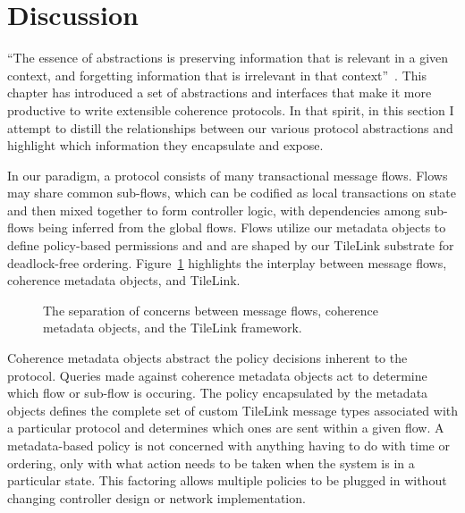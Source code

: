 
\section{Discussion}

``The essence of abstractions is preserving information that is relevant in a given context, and forgetting information that is irrelevant in that context''~\cite{guttag2014introduction}.
This chapter has introduced a set of abstractions and interfaces that make it more productive to write extensible coherence protocols.
In that spirit, in this section I attempt to distill the relationships between our various protocol abstractions and highlight which information they encapsulate and expose.


In our paradigm, a protocol consists of many transactional message flows.
Flows may share common sub-flows, which can be codified as local transactions on state
and then mixed together to form controller logic,
with dependencies among sub-flows being inferred from the global flows.
Flows utilize our metadata objects to define policy-based permissions
and and are shaped by our TileLink substrate for deadlock-free ordering.
Figure~\ref{fig:overview} highlights the interplay between message flows, coherence metadata objects, and TileLink.

\begin{figure}[t!]
\centering
\caption[Separation of Concerns.]{
The separation of concerns between message flows, coherence metadata objects, and the TileLink framework.
}
\label{fig:overview}
\end{figure}

Coherence metadata objects abstract the policy decisions inherent to the protocol.
Queries made against coherence metadata objects act to determine which flow or sub-flow is occuring.
The policy encapsulated by the metadata objects defines the complete set of custom TileLink message types
associated with a particular protocol and determines which ones are sent within a given flow.
A metadata-based policy is not concerned with anything having to do with time or ordering,
only with what action needs to be taken when the system is in a particular state.
This factoring allows multiple policies to be plugged in without changing controller design
or network implementation.

